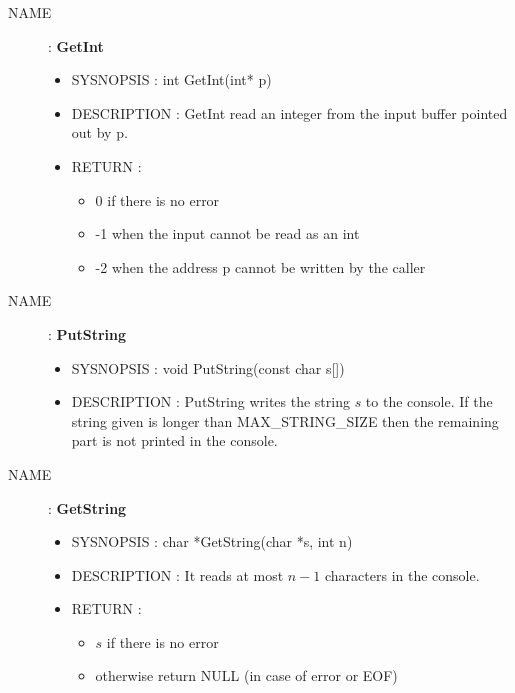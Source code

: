 \documentclass[a4paper,10pt]{article}
\begin{document}
\begin{description}
    \item [NAME] : \textbf{GetInt}
        \begin{itemize}
            \item SYSNOPSIS : int GetInt(int* p)
            \item DESCRIPTION :
                GetInt read an integer from the input buffer pointed out by p.
            \item RETURN :
                \begin{itemize}
                    \item 0 if there is no error
                    \item -1 when the input cannot be read as an int
                    \item -2 when the address p cannot be written by the caller
                \end{itemize}
        \end{itemize}

    \item [NAME] : \textbf{PutString}
        \begin{itemize}
            \item SYSNOPSIS : void PutString(const char s[])
            \item DESCRIPTION :
                PutString writes the string $s$ to the console. If the string given is longer than
                MAX\_STRING\_SIZE then the remaining part is not printed in the console.
        \end{itemize}

    \item [NAME] : \textbf{GetString}
        \begin{itemize}
            \item SYSNOPSIS : char *GetString(char *s, int n)
            \item DESCRIPTION :
                It reads at most $n-1$ characters in the console.
            \item RETURN :
                \begin{itemize}
                    \item $s$ if there is no error
                    \item otherwise return NULL (in case of error or EOF)
                \end{itemize}
        \end{itemize}


\end{description}
\end{document}
